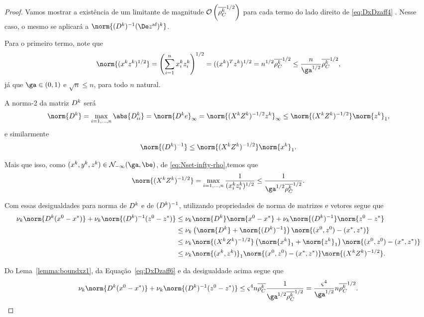 \begin{proof}
Vamos mostrar a existência de um limitante de magnitude $\mathcal{O}\left(\overline{\rho_C^{k}} ^{1/2}\right)$ para cada termo do lado direito de \eqref{eq:DxDzaff4} . Nesse caso, o mesmo se aplicará a $\norm{\Dik \dekz }$.

Para o primeiro termo, note que 
\begin{equation}
	\label{eq:DxDzaff5}
	\norm{(  \xk \zk  )^{1/2}} = \left(\sum_{i=1}^{n}\xk_i \zk_i\right)^{1/2} = ((\xk)^{T}\zk)^{1/2} = n^{1/2}\rhoCkb ^{1/2} \leq \frac{n}{\ga^{1/2}}\rhoCkb ^{1/2},
\end{equation}
já que $\ga\in(0,1)$ e $\sqrt{n}\leq n$, para todo $n$ natural.


A norma-2 da matriz  $D^{k}$ será
\[
 \norm{\Dk} = \max_{i=1,\ldots,n} \abs{\Dk_{ii}} = \norm{\Dk e}_{\infty} = \norm{(\Xk\Zk)^{-1/2}\zk}_{\infty} \leq \norm{(\Xk\Zk)^{-1/2}}\norm{\zk}_{1},
\]
e similarmente
\[
\norm{\Dik} \leq  \norm{(\Xk\Zk)^{-1/2}} \norm{\xk}_{1}.
\]

Mais que isso, como $(\xk,\yk,\zk)\in\Nset_{-\infty}(\ga,\be)$, de  \eqref{eq:Nset-infty-rho},temos que 
\begin{equation}
\label{eq:DxDzaff6}
	\norm{(\Xk\Zk)^{-1/2}} = \max_{i=1,\ldots,n}\frac{1}{(\xk_i\zk_i)^{1/2}} \leq \frac{1}{\ga^{1/2}\rhoCkb^{1/2}}.
\end{equation}

Com essas desigualdades para norma de $D^{k}$ e de $(D^{k})^{-1}$, utilizando propriedades de norma de matrizes e vetores segue que
\[
\begin{aligned}
 \nuk  \norm{\Dk(\xzero - \xstar)} + \nuk  \norm{\Dik(\zzero - \zstar)}  & \leq \nuk  \norm{\Dk}\norm{\xzero - \xstar} + \nuk  \norm{\Dik}\norm{\zzero - \zstar} \notag \\
 					& \leq \nuk \left(  \norm{\Dk} + \norm{\Dik}   \right)\norm{(\xzero,\zzero) - (\xstar,\zstar)} \\
 					& \leq \nuk  \norm{(\Xk\Zk)^{-1/2}} \left(  \norm{\xk}_{1}  +\norm{\zk}_{1}   \right)\norm{(\xzero,\zzero) - (\xstar,\zstar)} \\ 
 					& \leq  \nuk \norm{(\xk,\zk)}_{1}\norm{(\xzero,\zzero) - (\xstar,\zstar)}\norm{(\Xk\Zk)^{-1/2}}.
\end{aligned}
\]

Do Lema~\ref{lemma:boundxz1}, da Equação~\eqref{eq:DxDzaff6}  e da desigualdade acima segue que 
\begin{equation} \label{eq:DxDzaff7}
 \nuk  \norm{\Dk(\xzero - \xstar)} + \nuk  \norm{\Dik(\zzero - \zstar)}  \leq \bdxzstar^{4} n  \rhoCkb \frac{1}{\ga^{1/2}\rhoCkb ^{1/2}}  = \frac{\bdxzstar^{4}}{\ga^{1/2}}n \rhoCkb ^{1/2}.
\end{equation}


\end{proof}
